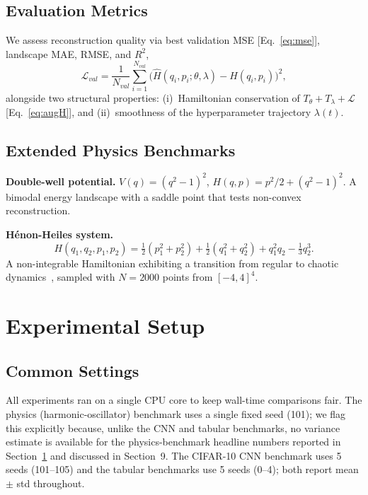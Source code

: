 \documentclass[11pt]{article}
\theoremstyle{definition}
\begin{document}
\subsection{Evaluation Metrics}

We assess reconstruction quality via best validation MSE
[Eq.~\eqref{eq:mse}], landscape MAE, RMSE, and $R^2$,
\begin{equation}
\mathcal{L}_{val}
= \frac{1}{N_{val}}\sum_{i=1}^{N_{val}}
  \bigl(\hat{H}(q_i,p_i;\theta,\lambda) - H(q_i,p_i)\bigr)^2,
\label{eq:mse}
\end{equation}
alongside two structural properties: (i)~Hamiltonian conservation of
$T_\theta+T_\lambda+\mathcal{L}$ [Eq.~\eqref{eq:augH}], and
(ii)~smoothness of the hyperparameter trajectory $\lambda(t)$.

\subsection{Extended Physics Benchmarks}

\textbf{Double-well potential.}
$V(q)=(q^2-1)^2$, $H(q,p)=p^2/2+(q^2-1)^2$. A bimodal energy
landscape with a saddle point that tests non-convex reconstruction.

\textbf{H\'{e}non-Heiles system.}
\begin{equation*}
H(q_1,q_2,p_1,p_2) = \tfrac{1}{2}(p_1^2+p_2^2)
 + \tfrac{1}{2}(q_1^2+q_2^2) + q_1^2 q_2 - \tfrac{1}{3}q_2^3.
\end{equation*}
A non-integrable Hamiltonian exhibiting a transition from regular to
chaotic dynamics~\cite{henon1964,offen2022learning}, sampled with
$N=2000$ points from $[-4,4]^4$.


\section{Experimental Setup}
\label{sec:setup}

\subsection{Common Settings}

All experiments ran on a single CPU core to keep wall-time
comparisons fair. The physics (harmonic-oscillator) benchmark uses a
single fixed seed (101); we flag this explicitly because, unlike the
CNN and tabular benchmarks, no variance estimate is available for the
physics-benchmark headline numbers reported in
Section~\ref{sec:setup} and discussed in Section~9. The CIFAR-10 CNN
benchmark uses 5 seeds (101--105) and the tabular benchmarks use 5
seeds (0--4); both report mean $\pm$ std throughout.
\end{document}
